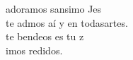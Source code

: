\begin{cancion}[Te adoramos][]%
	adoramos sansimo Jes\\
	te admos aí y en todasartes.\\
	te bendeos es  tu z\\
	imos redidos.\\
\end{cancion}%
